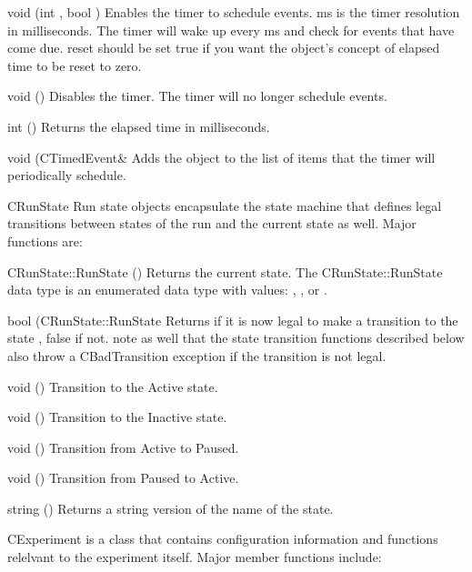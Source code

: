 \begin{description}
	    \begin{description}
	       \item{void (int , bool )}
		  Enables the timer
		  to schedule events.  {\param ms} is the timer resolution in 
		  milliseconds.  The timer will wake up every {\param ms} and
		  check for events that have come due. {\param reset} 
		  should be set true if you want the object's concept of elapsed
		  time to be reset to zero.
	       \item{void ()} Disables the timer.  The timer
		   will no longer schedule events.
	       \item{int ()} Returns the elapsed
		  time in milliseconds.  
	       \item{void (CTimedEvent\& }
		  Adds the object  to the list of items that
		  the timer will periodically schedule.
	    \end{description}
	    \htmlrule
	 \item{CRunState} Run state objects encapsulate the state machine
	    that defines legal transitions between states of the run and the
	    current state as well.  Major functions are:
	    
	       \begin{description}
		  \item{CRunState::RunState \function{getState}()}
		     Returns the current state.  The CRunState::RunState
		     data type is an enumerated data type with values:
		     , , or \param{Paused}.
		  \item{bool (CRunState::RunState \param{NewState}}
		     Returns  if it is now legal to make a transition
		     to the state , false if not.  note as
		     well that the state transition functions described below
		     also throw a CBadTransition exception if the transition is
		     not legal.
		  \item{void ()} Transition to the Active state.
		  \item{void ()} Transition to the Inactive state.
		  \item{void ()} Transition from Active to
		     Paused.
		  \item{void ()} Transition from Paused to
		     Active.
		  \item{string ()} Returns a string
		     version of the name of the state.
	       \end{description}
	       \htmlrule
	  \item{CExperiment} is a class that contains configuration 
	     information and functions relelvant to the experiment itself. Major
	     member functions include:


\end{description}
